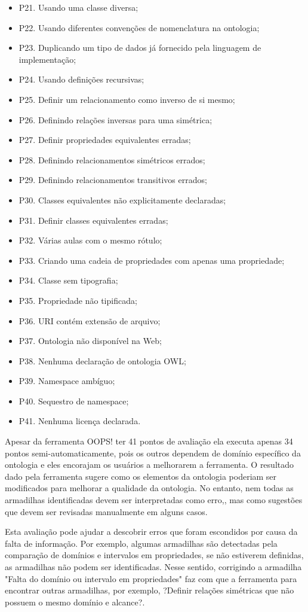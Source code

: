 \begin{itemize}
	\item P21. Usando uma classe diversa;
	\item P22. Usando diferentes convenções de nomenclatura na ontologia;
	\item P23. Duplicando um tipo de dados já fornecido pela linguagem de implementação;
	\item P24. Usando definições recursivas;
	\item P25. Definir um relacionamento como inverso de si mesmo;
	\item P26. Definindo relações inversas para uma simétrica;
	\item P27. Definir propriedades equivalentes erradas;
	\item P28. Definindo relacionamentos simétricos errados;
	\item P29. Definindo relacionamentos transitivos errados;
	\item P30. Classes equivalentes não explicitamente declaradas;
	\item P31. Definir classes equivalentes erradas;
	\item P32. Várias aulas com o mesmo rótulo;
	\item P33. Criando uma cadeia de propriedades com apenas uma propriedade;
	\item P34. Classe sem tipografia;
	\item P35. Propriedade não tipificada;
	\item P36. URI contém extensão de arquivo;
	\item P37. Ontologia não disponível na Web;
	\item P38. Nenhuma declaração de ontologia OWL;
	\item P39. Namespace ambíguo;
	\item P40. Sequestro de namespace;
	\item P41. Nenhuma licença declarada.
\end{itemize}

Apesar da ferramenta OOPS! ter 41 pontos de avaliação ela executa apenas 34 pontos semi-automaticamente, pois os outros dependem de domínio específico da ontologia e eles encorajam os usuários a melhorarem a ferramenta. O resultado dado pela ferramenta sugere como os elementos da ontologia poderiam ser modificados para melhorar a qualidade da ontologia. No entanto, nem todas as armadilhas identificadas devem ser interpretadas como erro,, mas como sugestões que devem ser revisadas manualmente em alguns casos. 

Esta avaliação pode ajudar a descobrir erros que foram escondidos por causa da falta de informação. Por exemplo, algumas armadilhas são detectadas pela comparação de domínios e intervalos em propriedades, se não estiverem definidas, as armadilhas não podem ser identificadas. Nesse sentido, corrigindo a armadilha "Falta do domínio ou intervalo em propriedades"  faz com que a ferramenta para encontrar outras armadilhas, por exemplo, ?Definir relações simétricas que não possuem o mesmo domínio e alcance?.

